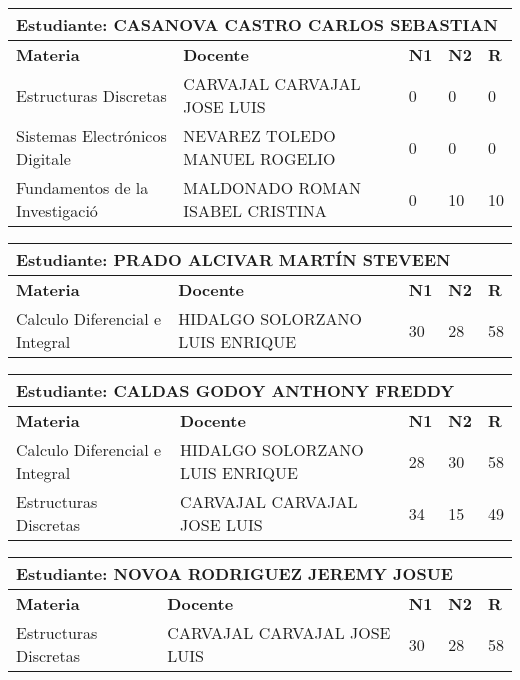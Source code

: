\begin{tabularx}{\textwidth}{|p{5cm}|p{7cm}|X|X|X|}
\hline
\multicolumn{5}{|p{\dimexpr\textwidth-2\tabcolsep-2\arrayrulewidth}|}{\textbf{Estudiante: CASANOVA CASTRO CARLOS SEBASTIAN }}\\\hline
\textbf{Materia} & \textbf{Docente} & \textbf{N1} & \textbf{N2} & \textbf{R} \\ \hline
Estructuras Discretas & CARVAJAL CARVAJAL JOSE LUIS  & 0 & 0& 0 \\ \hline
Sistemas Electrónicos Digitale & NEVAREZ TOLEDO MANUEL ROGELIO  & 0 & 0& 0 \\ \hline
Fundamentos de la Investigació & MALDONADO ROMAN ISABEL CRISTINA  & 0 & 10& 10 \\ \hline
\end{tabularx}\vspace{10mm}
\small
\begin{tabularx}{\textwidth}{|p{5cm}|p{7cm}|X|X|X|}
\hline
\multicolumn{5}{|p{\dimexpr\textwidth-2\tabcolsep-2\arrayrulewidth}|}{\textbf{Estudiante: PRADO ALCIVAR MARTÍN STEVEEN }}\\\hline
\textbf{Materia} & \textbf{Docente} & \textbf{N1} & \textbf{N2} & \textbf{R} \\ \hline
Calculo Diferencial e Integral & HIDALGO SOLORZANO LUIS ENRIQUE  & 30 & 28& 58 \\ \hline
\end{tabularx}\vspace{10mm}
\small
\begin{tabularx}{\textwidth}{|p{5cm}|p{7cm}|X|X|X|}
\hline
\multicolumn{5}{|p{\dimexpr\textwidth-2\tabcolsep-2\arrayrulewidth}|}{\textbf{Estudiante: CALDAS GODOY ANTHONY FREDDY }}\\\hline
\textbf{Materia} & \textbf{Docente} & \textbf{N1} & \textbf{N2} & \textbf{R} \\ \hline
Calculo Diferencial e Integral & HIDALGO SOLORZANO LUIS ENRIQUE  & 28 & 30& 58 \\ \hline
Estructuras Discretas & CARVAJAL CARVAJAL JOSE LUIS  & 34 & 15& 49 \\ \hline
\end{tabularx}\vspace{10mm}
\small
\begin{tabularx}{\textwidth}{|p{5cm}|p{7cm}|X|X|X|}
\hline
\multicolumn{5}{|p{\dimexpr\textwidth-2\tabcolsep-2\arrayrulewidth}|}{\textbf{Estudiante: NOVOA RODRIGUEZ JEREMY JOSUE }}\\\hline
\textbf{Materia} & \textbf{Docente} & \textbf{N1} & \textbf{N2} & \textbf{R} \\ \hline
Estructuras Discretas & CARVAJAL CARVAJAL JOSE LUIS  & 30 & 28& 58 \\ \hline
\end{tabularx}\vspace{10mm}
